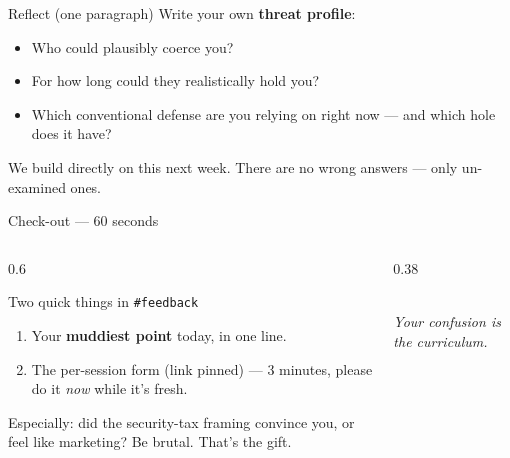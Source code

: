 \documentclass[aspectratio=169,11pt]{beamer}
\begin{document}
\begin{frame}{Reflect (one paragraph)}
  Write your own \textbf{threat profile}:
  \begin{itemize}
    \item Who could plausibly coerce you?
    \item For how long could they realistically hold you?
    \item Which conventional defense are you relying on right now --- and which
      hole does it have?
  \end{itemize}
  \vspace{6pt}
  We build directly on this next week. There are no wrong answers --- only
  un-examined ones.
\end{frame}

\begin{frame}{Check-out --- 60 seconds}
  \begin{columns}[T]
    \begin{column}{0.6\textwidth}
      \begin{block}{Two quick things in \texttt{\#feedback}}
        \begin{enumerate}\small
          \item Your \textbf{muddiest point} today, in one line.
          \item The per-session form (link pinned) --- 3 minutes, please do it
            \emph{now} while it's fresh.
        \end{enumerate}
      \end{block}
      \vspace{4pt}
      \footnotesize Especially: did the security-tax framing convince you, or
      feel like marketing? Be brutal. That's the gift.
    \end{column}
    \begin{column}{0.38\textwidth}
      \begin{center}
      \gwflagicon\\[4pt]
      {\footnotesize\color{attackcol}\itshape Your confusion is the curriculum.}
      \end{center}
    \end{column}
  \end{columns}
\end{frame}

\end{document}
